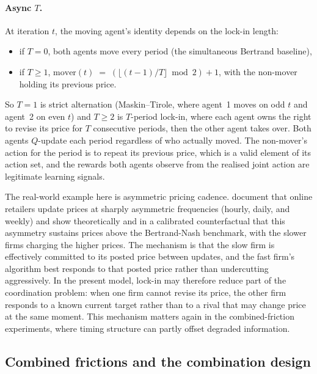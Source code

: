 \paragraph{Async $T$.}
At iteration $t$, the moving agent's identity depends on the lock-in length:
\begin{itemize}[topsep=2pt, itemsep=2pt, leftmargin=*]
    \item if $T = 0$, both agents move every period (the simultaneous Bertrand baseline),
    \item if $T \geq 1$, $\mathrm{mover}(t) \;=\; (\lfloor (t-1)/T\rfloor \bmod 2) + 1$, with the non-mover holding its previous price.
\end{itemize}
So $T=1$ is strict alternation (Maskin--Tirole, where agent~1 moves on odd $t$ and agent~2 on even $t$) and $T\geq 2$ is $T$-period lock-in, where each agent owns the right to revise its price for $T$ consecutive periods, then the other agent takes over. Both agents $Q$-update each period regardless of who actually moved. The non-mover's action for the period is to repeat its previous price, which is a valid element of its action set, and the rewards both agents observe from the realised joint action are legitimate learning signals.

The real-world example here is asymmetric pricing cadence. \citet{brown2023} document that online retailers update prices at sharply asymmetric frequencies (hourly, daily, and weekly) and show theoretically and in a calibrated counterfactual that this asymmetry sustains prices above the Bertrand-Nash benchmark, with the slower firms charging the higher prices. The mechanism is that the slow firm is effectively committed to its posted price between updates, and the fast firm's algorithm best responds to that posted price rather than undercutting aggressively. In the present model, lock-in may therefore reduce part of the coordination problem: when one firm cannot revise its price, the other firm responds to a known current target rather than to a rival that may change price at the same moment. This mechanism matters again in the combined-friction experiments, where timing structure can partly offset degraded information.

\subsection{Combined frictions and the combination design}
\label{sec:methodology-combined}

